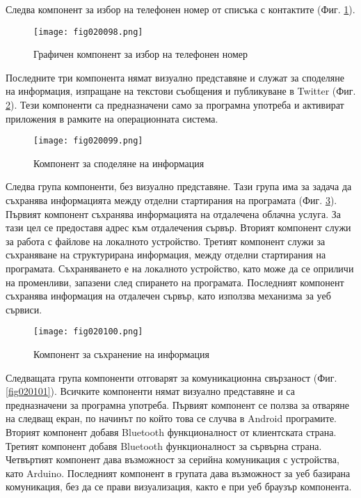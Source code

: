 Следва компонент за избор на телефонен номер от списъка с контактите (Фиг. \ref{fig020098}).

\begin{figure}[H]
  \centering
  \texttt{[image: fig020098.png]}
  \caption{Графичен компонент за избор на телефонен номер}
\label{fig020098}
\end{figure}

Последните три компонента нямат визуално представяне и служат за споделяне на информация, изпращане на текстови съобщения и публикуване в Twitter (Фиг. \ref{fig020099}). Тези компоненти са предназначени само за програмна употреба и активират приложения в рамките на операционната система.

\begin{figure}[H]
  \centering
  \texttt{[image: fig020099.png]}
  \caption{Компонент за споделяне на информация}
\label{fig020099}
\end{figure}

Следва група компоненти, без визуално представяне. Тази група има за задача да съхранява информацията между отделни стартирания на програмата (Фиг. \ref{fig020100}). Първият компонент съхранява информацията на отдалечена облачна услуга. За тази цел се предоставя адрес към отдалечения сървър. Вторият компонент служи за работа с файлове на локалното устройство. Третият компонент служи за съхраняване на структурирана информация, между отделни стартирания на програмата. Съхраняването е на локалното устройство, като може да се оприличи на променливи, запазени след спирането на програмата. Последният компонент съхранява информация на отдалечен сървър, като използва механизма за уеб сървиси. 

\begin{figure}[H]
  \centering
  \texttt{[image: fig020100.png]}
  \caption{Компонент за съхранение на информация}
\label{fig020100}
\end{figure}

Следващата група компоненти отговарят за комуникационна свързаност (Фиг. \ref{fig020101}). Всичките компоненти нямат визуално представяне и са предназначени за програмна употреба. Първият компонент се ползва за отваряне на следващ екран, по начинът по който това се случва в Android програмите. Вторият компонент добавя Bluetooth функционалност от клиентската страна. Третият компонент добавя Bluetooth функционалност за сървърна страна. Четвъртият компонент дава възможност за серийна комуникация с устройства, като Arduino. Последният компонент в групата дава възможност за уеб базирана комуникация, без да се прави визуализация, както е при уеб браузър компонента. 

